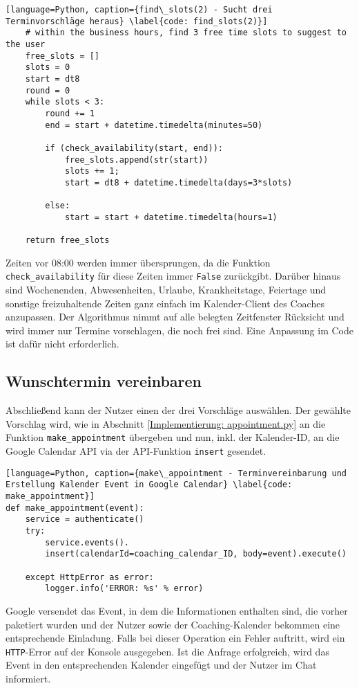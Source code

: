             \begin{lstlisting}[language=Python, caption={find\_slots(2) - Sucht drei Terminvorschläge heraus} \label{code: find_slots(2)}]
    # within the business hours, find 3 free time slots to suggest to the user
    free_slots = []
    slots = 0
    start = dt8
    round = 0
    while slots < 3:
        round += 1
        end = start + datetime.timedelta(minutes=50)
        
        if (check_availability(start, end)): 
            free_slots.append(str(start))
            slots += 1;
            start = dt8 + datetime.timedelta(days=3*slots)

        else: 
            start = start + datetime.timedelta(hours=1)
        
    return free_slots
            \end{lstlisting}
            Zeiten vor 08:00 werden immer übersprungen, da die Funktion \verb|check_availability| für diese Zeiten immer \verb|False| zurückgibt. Darüber hinaus sind Wochenenden, Abwesenheiten, Urlaube, Krankheitstage, Feiertage und sonstige freizuhaltende Zeiten ganz einfach im Kalender-Client des Coaches anzupassen. Der Algorithmus nimmt auf alle belegten Zeitfenster Rücksicht und wird immer nur Termine vorschlagen, die noch frei sind. Eine Anpassung im Code ist dafür nicht erforderlich.


        \subsection{Wunschtermin vereinbaren}
            Abschließend kann der Nutzer einen der drei Vorschläge auswählen. Der gewählte Vorschlag wird, wie in Abschnitt \ref*{Implementierung: appointment.py} an die Funktion \verb|make_appointment| übergeben und nun, inkl. der Kalender-ID, an die Google Calendar API via der API-Funktion \verb|insert| gesendet. 

            \begin{lstlisting}[language=Python, caption={make\_appointment - Terminvereinbarung und Erstellung Kalender Event in Google Calendar} \label{code: make_appointment}]
def make_appointment(event):
    service = authenticate()
    try:
        service.events().
        insert(calendarId=coaching_calendar_ID, body=event).execute()

    except HttpError as error:
        logger.info('ERROR: %s' % error)
            \end{lstlisting}
            Google versendet das Event, in dem die Informationen enthalten sind, die vorher paketiert wurden und der Nutzer sowie der Coaching-Kalender bekommen eine entsprechende Einladung. Falls bei dieser Operation ein Fehler auftritt, wird ein \verb|HTTP|-Error auf der Konsole ausgegeben. Ist die Anfrage erfolgreich, wird das Event in den entsprechenden Kalender eingefügt und der Nutzer im Chat informiert.

